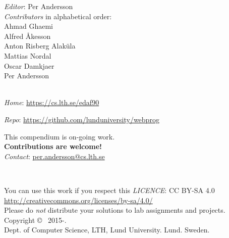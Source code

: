 
\clearpage\null\thispagestyle{empty}
\vfill

{
\setlength{\parindent}{0pt}
\emph{Editor}: Per Andersson \\

%
\emph{Contributors} in alphabetical order: \\
Ahmad Ghaemi\\
Alfred Åkesson\\
Anton Risberg Alaküla\\
Mattias Nordal\\
Oscar Damkjaer\\
Per Andersson \\
\\ \newline

\emph{Home}: \url{https://cs.lth.se/edaf90} \newline

\emph{Repo}: \url{https://github.com/lunduniversity/webprog} \\ \newline

This compendium is on-going work. \\ \textbf{Contributions are welcome!} \\
\emph{Contact}: \url{per.andersson@cs.lth.se}
\\ \newline

~\\ \newline

You can use this work if you respect this \emph{LICENCE}: CC BY-SA 4.0 \\
\url{http://creativecommons.org/licenses/by-sa/4.0/} \\
Please do \emph{not} distribute your solutions to lab assignments and projects.
\\ \newline
Copyright \copyright~ 2015-\the\year. \\
Dept. of Computer Science, LTH, Lund University. Lund. Sweden.\\
}